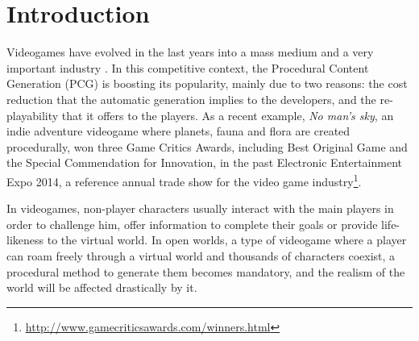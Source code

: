 \documentclass[conference]{IEEEtran}
\begin{document}
\section{Introduction}
\label{sec:intro}

Videogames have evolved in the last years into a mass medium and a very important industry \cite{esa_century_2014}. In this competitive context, the
Procedural Content Generation (PCG) is boosting its
popularity, mainly due to two reasons: the cost reduction that the automatic generation implies to the developers, and the re-playability that it offers to the players. As a recent example,
\textit{No man's sky}, an indie adventure videogame where planets,
fauna and flora are created procedurally, won three Game Critics
Awards, including Best Original Game and the Special Commendation for
Innovation, in the past Electronic Entertainment Expo 2014, a
reference annual trade show for the video game
industry\footnote{\url{http://www.gamecriticsawards.com/winners.html}}.

In videogames, non-player characters usually interact with the main
players in order to challenge him, offer information to complete their
goals or
provide life-likeness to the virtual world. In open worlds, a type of videogame where a player can roam freely through a virtual world and thousands of characters coexist, a procedural method to generate
them becomes mandatory, and the realism of the world will be affected
drastically by it.
\end{document}

